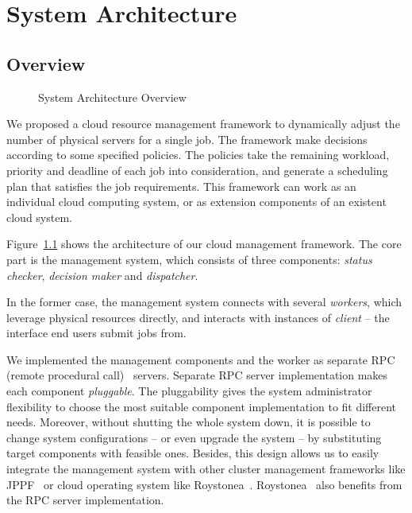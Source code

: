 \chapter{System Architecture}

\section{Overview}

\begin{figure}[h]
  \centering
  
  \caption{System Architecture Overview}
  \label{fig:archi-overview}
\end{figure}

We proposed a cloud resource management framework to dynamically adjust
the number of physical servers for a single job.
The framework make decisions according to some specified policies.
The policies take the remaining workload, priority and deadline of each
job into consideration, and generate a scheduling plan that satisfies
the job requirements.
This framework can work as an individual cloud computing system, or as
extension components of an existent cloud system.

Figure~\ref{fig:archi-overview} shows the architecture of our cloud
management framework.
The core part is the management system, which consists of three
components: \emph{status checker}, \emph{decision maker} and
\emph{dispatcher}.

In the former case, the management system connects with several
\emph{workers}, which leverage physical resources directly, and
interacts with instances of \emph{client} -- the interface end users
submit jobs from.

We implemented the management components and the worker as separate RPC
(remote procedural call)~\cite{cite:RPC} servers.
Separate RPC server implementation makes each component
\emph{pluggable}.
The pluggability gives the system administrator flexibility to choose
the most suitable component implementation to fit different needs.
Moreover, without shutting the whole system down, it is possible to
change system configurations -- or even upgrade the system -- by
substituting target components with feasible ones.
Besides, this design allows us to easily integrate the management system
with other cluster management frameworks like JPPF~\cite{cite:JPPF} or
cloud operating system like Roystonea~\cite{cite:roystonea}.
Roystonea~\cite{cite:roystonea} also benefits from the RPC server
implementation.

